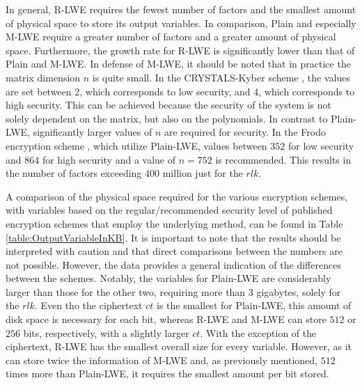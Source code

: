 In general, R-LWE requires the fewest number of factors and the smallest amount of physical space to store its output variables. In comparison, Plain and especially M-LWE require a greater number of factors and a greater amount of physical space. Furthermore, the growth rate for R-LWE is significantly lower than that of Plain and M-LWE. In defense of M-LWE, it should be noted that in practice the matrix dimension $n$ is quite small. In the CRYSTALS-Kyber scheme \cite{CyrstalsKyber}, the values are set between 2, which corresponds to low security, and 4, which corresponds to high security. This can be achieved because the security of the system is not solely dependent on the matrix, but also on the polynomials. In contrast to Plain-LWE, significantly larger values of $n$ are required for security. In the Frodo encryption scheme \cite{frodo}, which utilize Plain-LWE, values between $352$ for low security and $864$ for high security and a value of $n=752$ is recommended. This results in the number of factors exceeding $400$ million just for the $rlk$.

A comparison of the physical space required for the various encryption schemes, with variables based on the regular/recommended security level of published encryption schemes that employ the underlying method, can be found in Table \ref{table:OutputVariableInKB}. It is important to note that the results should be interpreted with caution and that direct comparisons between the numbers are not possible. However, the data provides a general indication of the differences between the schemes. Notably, the variables for Plain-LWE are considerably larger than those for the other two, requiring more than $3$ gigabytes, solely for the $rlk$. Even tho the ciphertext $ct$ is the smallest for Plain-LWE, this amount of disk space is necessary for each bit, whereas R-LWE and M-LWE can store $512$ or $256$ bits, respectively, with a slightly larger $ct$. With the exception of the ciphertext, R-LWE has the smallest overall size for every variable. However, as it can store twice the information of M-LWE and, as previously mentioned, $512$ times more than Plain-LWE, it requires the smallest amount per bit stored.

